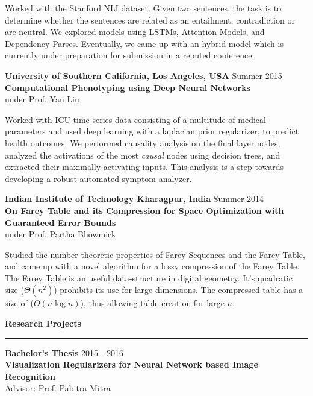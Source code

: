 \documentclass[10pt]{article}
\newcommand{\heading}[1]{
 {\large \textbf{#1}}
  \vspace{0.4em}
  \hrule
  \vspace{0.4em}
}
\newcommand{\EntryGap}{\vspace{0.5cm}}
\newcommand{\SmallEntryGap}{\vspace{0.2cm}}
\newcommand{\indentedpar}[1]{
  \hangindent=1cm \hangafter=0 #1
}
\begin{document}
\SmallEntryGap

\indentedpar{
  Worked with the Stanford NLI dataset. Given two sentences, the task
  is to determine whether the sentences are related as an entailment, contradiction
  or are neutral. We explored models using LSTMs, Attention
  Models, and Dependency Parses. Eventually, we came up with an hybrid model which
  is currently under preparation for submission in a reputed conference.
}

\SmallEntryGap

\textbf{University of Southern California, Los Angeles, USA} \hfill Summer 2015\\
\textbf{Computational Phenotyping using Deep Neural Networks}\\
under Prof. Yan Liu

\SmallEntryGap

\indentedpar{
  Worked with ICU time series data consisting of a multitude of medical parameters
  and used deep learning with a laplacian prior regularizer, to predict health outcomes. We
  performed causality analysis on the final layer nodes, analyzed the activations of 
  the most \emph{causal} nodes using decision trees, and extracted their maximally activating 
  inputs. This analysis is a step towards developing a robust automated symptom analyzer.
}

\SmallEntryGap
\textbf{Indian Institute of Technology Kharagpur, India} \hfill Summer 2014\\
\textbf{On Farey Table and its Compression for Space Optimization with Guaranteed Error Bounds}\\
under Prof. Partha Bhowmick

\SmallEntryGap

\indentedpar{
  Studied the number theoretic properties of Farey Sequences and the
  Farey Table, and came up with a novel algorithm for a lossy compression of the 
  Farey Table. The Farey Table is an useful data-structure in digital geometry.
  It's quadratic size ($\Theta(n^2)$) prohibits its use for large dimensions. The
  compressed table has a size of ($O(n\log n)$), thus allowing table creation for
  large $n$.
}




\EntryGap
\heading{Research Projects}

\textbf{Bachelor's Thesis} \hfill 2015 - 2016\\
\textbf{Visualization Regularizers for Neural Network based Image Recognition}\\
Advisor: Prof. Pabitra Mitra
\end{document}
